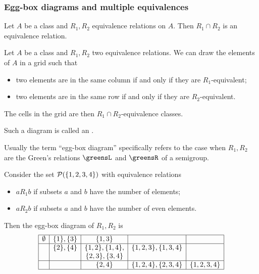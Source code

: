 \subsubsection{Egg-box diagrams and multiple equivalences}
\begin{lemma}
Let $A$ be a class and $R_1, R_2$ equivalence relations on $A$. Then $R_1 \cap R_2$ is an equivalence relation.
\end{lemma}

\begin{definition}
Let $A$ be a class and $R_1, R_2$ two equivalence relations. We can draw the elements of $A$ in a grid such that
\begin{itemize}
\item two elements are in the same column \textup{if and only if} they are $R_1$-equivalent;
\item two elements are in the same row \textup{if and only if} they are $R_2$-equivalent.
\end{itemize}
The cells in the grid are then $R_1\cap R_2$-equivalence classes.

Such a diagram is called an .
\end{definition}

Usually the term ``egg-box diagram'' specifically refers to the case when $R_1, R_2$ are the Green's relations $\greensL$ and $\greensR$ of a semigroup.

\begin{example}
Consider the set $\operatorname{\mathcal{P}}(\{1,2,3,4\})$ with equivalence relations
\begin{itemize}
\item $aR_1 b$ if subsets $a$ and $b$ have the number of elements;
\item $aR_2 b$ if subsets $a$ and $b$ have the number of even elements.
\end{itemize}
Then the egg-box diagram of $R_1,R_2$ is
\[ \begin{array}{|c|c|c|c|c|}
\hline
\emptyset & \{1\}, \{3\} & \{1,3\} && \\ \hline
& \{2\}, \{4\} & \{1,2\}, \{1,4\}, & \{1,2,3\}, \{1,3,4\} & \\
&  & \{2,3\}, \{3,4\} &  & \\ \hline
&& \{2,4\} & \{1,2,4\}, \{2,3,4\}  & \{1,2,3,4\}    \\ \hline
\end{array} \]
\end{example}

